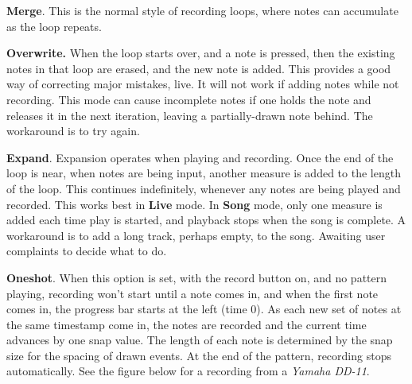    \begin{enumber}
      \item \textbf{Merge}.
         This is the normal style of recording loops, where notes can
         accumulate as the loop repeats.
      \item \textbf{Overwrite.}
         When the loop starts over, and a note is pressed,
         then the existing notes in that loop are erased,
         and the new note is added.
         This provides a good way of correcting major mistakes, live.
         It will not work if adding notes while not recording.
         This mode can cause incomplete notes if one
         holds the note and releases it in the next iteration, leaving a
         partially-drawn note behind.  The workaround is to try again.
      \item \textbf{Expand}.
         Expansion operates when playing and recording.
         Once the end of the loop is near, when
         notes are being input, another measure is added to the length
         of the loop.
         This continues indefinitely, whenever any notes are
         being played and recorded.
         This works best in \textbf{Live} mode.
         In \textbf{Song} mode, only one measure is added each time play is
         started, and playback stops when the song is complete.
         A workaround is to add a long track, perhaps empty, to the song.
         Awaiting user complaints to decide what to do.
      \item \textbf{Oneshot}.
         When this option is set, with the record button on, and no pattern
         playing, recording won't start until a note comes in, and when the
         first note comes in, the progress bar starts at the left (time 0).
         As each new set of notes at the same timestamp come in, the
         notes are recorded and the current time advances by one snap value.
         The length of each note is determined by the snap size for the spacing
         of drawn events.
         At the end of the pattern, recording stops automatically.
         See the figure
         below for a recording from a \textsl{Yamaha DD-11}.
   \end{enumber}

